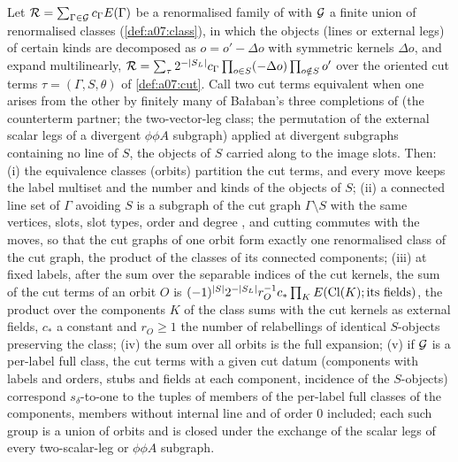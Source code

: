 \begin{lemma}\label{hyp:k01:RENorb}
Let $\mathcal R=\sum_{\Gamma\in\mathcal G}c_\Gamma E(\Gamma)$ be a renormalised family of \cite[Sects.~1--3]{Ba3} with $\mathcal G$ a finite union of renormalised classes (\cref{def:a07:class}), in which the objects (lines or external legs) of certain kinds are decomposed as $o=o'-\Delta o$ with symmetric kernels $\Delta o$, and expand multilinearly, $\mathcal R=\sum_\tau2^{-|S_L|}c_\Gamma\prod_{o\in S}(-\Delta o)\prod_{o\notin S}o'$ over the oriented cut terms $\tau=(\Gamma,S,\theta)$ of \cref{def:a07:cut}. Call two cut terms equivalent when one arises from the other by finitely many of Ba{\l}aban's three completions of \cite[pp.~420, 429--432]{Ba3} (the counterterm partner; the two-vector-leg class; the permutation of the external scalar legs of a divergent $\phi\phi A$ subgraph) applied at divergent subgraphs containing no line of $S$, the objects of $S$ carried along to the image slots. Then: \textup{(i)} the equivalence classes (orbits) partition the cut terms, and every move keeps the label multiset and the number and kinds of the objects of $S$; \textup{(ii)} a connected line set of $\Gamma$ avoiding $S$ is a subgraph of the cut graph $\Gamma\setminus S$ with the same vertices, slots, slot types, order and degree \cite[(2.1)--(2.3)]{Ba3}, and cutting commutes with the moves, so that the cut graphs of one orbit form exactly one renormalised class of the cut graph, the product of the classes of its connected components; \textup{(iii)} at fixed labels, after the sum over the separable indices of the cut kernels, the sum of the cut terms of an orbit $O$ is $(-1)^{|S|}2^{-|S_L|}r_O^{-1}c_*\prod_KE(\operatorname{Cl}(K);\text{its fields})$, the product over the components $K$ of the class sums with the cut kernels as external fields, $c_*$ a constant and $r_O\ge1$ the number of relabellings of identical $S$-objects preserving the class; \textup{(iv)} the sum over all orbits is the full expansion; \textup{(v)} if $\mathcal G$ is a per-label full class, the cut terms with a given cut datum (components with labels and orders, stubs and fields at each component, incidence of the $S$-objects) correspond $s_\delta$-to-one to the tuples of members of the per-label full classes of the components, members without internal line and of order $0$ included; each such group is a union of orbits and is closed under the exchange of the scalar legs of every two-scalar-leg or $\phi\phi A$ subgraph.
\end{lemma}
